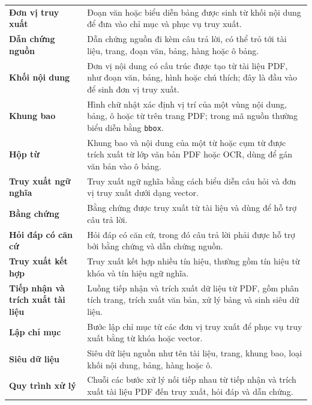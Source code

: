 \documentclass[../DoAn.tex]{subfiles}
\begin{document}
\begin{longtable}{
    @{}
    >{\raggedright\arraybackslash}p{}
    >{\raggedright\arraybackslash}p{}
    @{}
}
\textbf{Đơn vị truy xuất}
& Đoạn văn hoặc biểu diễn bảng được sinh từ khối nội dung để đưa vào chỉ mục và phục vụ truy xuất. \\

\textbf{Dẫn chứng nguồn}
& Dẫn chứng nguồn đi kèm câu trả lời, có thể trỏ tới tài liệu, trang, đoạn văn, bảng, hàng hoặc ô bảng. \\

\textbf{Khối nội dung}
& Đơn vị nội dung có cấu trúc được tạo từ tài liệu PDF, như đoạn văn, bảng, hình hoặc chú thích; đây là đầu vào để sinh đơn vị truy xuất. \\

\textbf{Khung bao}
& Hình chữ nhật xác định vị trí của một vùng nội dung, bảng, ô hoặc từ trên trang PDF; trong mã nguồn thường biểu diễn bằng \texttt{bbox}. \\

\textbf{Hộp từ}
& Khung bao và nội dung của một từ hoặc cụm từ được trích xuất từ lớp văn bản PDF hoặc OCR, dùng để gán văn bản vào ô bảng. \\

\textbf{Truy xuất ngữ nghĩa}
& Truy xuất ngữ nghĩa bằng cách biểu diễn câu hỏi và đơn vị truy xuất dưới dạng vector. \\

\textbf{Bằng chứng}
& Bằng chứng được truy xuất từ tài liệu và dùng để hỗ trợ câu trả lời. \\

\textbf{Hỏi đáp có căn cứ}
& Hỏi đáp có căn cứ, trong đó câu trả lời phải được hỗ trợ bởi bằng chứng và dẫn chứng nguồn. \\

\textbf{Truy xuất kết hợp}
& Truy xuất kết hợp nhiều tín hiệu, thường gồm tín hiệu từ khóa và tín hiệu ngữ nghĩa. \\

\textbf{Tiếp nhận và trích xuất tài liệu}
& Luồng tiếp nhận và trích xuất dữ liệu từ PDF, gồm phân tích trang, trích xuất văn bản, xử lý bảng và sinh siêu dữ liệu. \\

\textbf{Lập chỉ mục}
& Bước lập chỉ mục từ các đơn vị truy xuất để phục vụ truy xuất bằng từ khóa hoặc vector. \\

\textbf{Siêu dữ liệu}
& Siêu dữ liệu nguồn như tên tài liệu, trang, khung bao, loại khối nội dung, bảng, hàng hoặc ô. \\

\textbf{Quy trình xử lý}
& Chuỗi các bước xử lý nối tiếp nhau từ tiếp nhận và trích xuất tài liệu PDF đến truy xuất, hỏi đáp và dẫn chứng. \\


\end{longtable}
\end{document}
